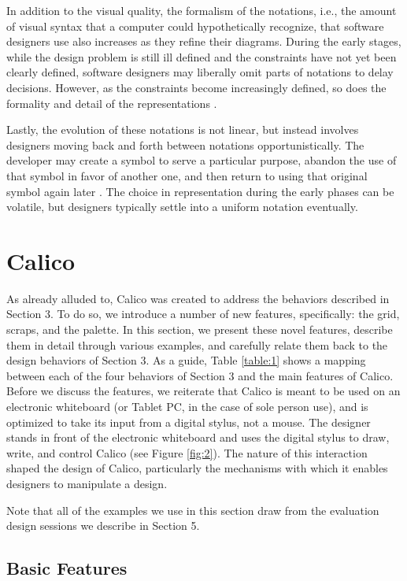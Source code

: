 In addition to the visual quality, the formalism of the notations, i.e., the amount of visual syntax that a computer could hypothetically recognize, that software designers use also increases as they refine their diagrams. During the early stages, while the design problem is still ill defined and the constraints have not yet been clearly defined, software designers may liberally omit parts of notations to delay decisions. However, as the constraints become increasingly defined, so does the formality and detail of the representations \citep{Ossher}. 

Lastly, the evolution of these notations is not linear, but instead involves designers moving back and forth between notations opportunistically. The developer may create a symbol to serve a particular purpose, abandon the use of that symbol in favor of another one, and then return to using that original symbol again later \citep{Dekela}. The choice in representation during the early phases can be volatile, but designers typically settle into a uniform notation eventually.

\section{Calico}
\label{calico}
As already alluded to, Calico was created to address the behaviors described in Section 3. To do so, we introduce a number of new features, specifically: the grid, scraps, and the palette. In this section, we present these novel features, describe them in detail through various examples, and carefully relate them back to the design behaviors of Section 3. As a guide, Table \ref{table:1} shows a mapping between each of the four behaviors of Section 3 and the main features of Calico.
Before we discuss the features, we reiterate that Calico is meant to be used on an electronic whiteboard (or Tablet PC, in the case of sole person use), and is optimized to take its input from a digital stylus, not a mouse. The designer stands in front of the electronic whiteboard and uses the digital stylus to draw, write, and control Calico (see Figure \ref{fig:2}). The nature of this interaction shaped the design of Calico, particularly the mechanisms with which it enables designers to manipulate a design.

Note that all of the examples we use in this section draw from the evaluation design sessions we describe in Section 5.

\subsection {Basic Features}
\label{calico:1}


